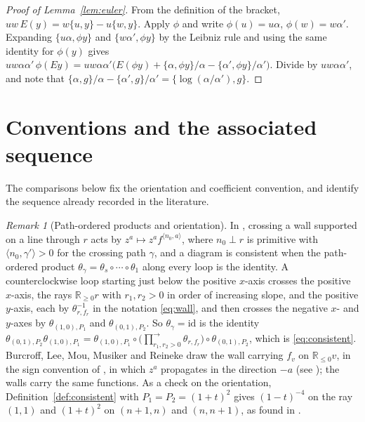 \documentclass[11pt]{article}
\theoremstyle{definition}
\theoremstyle{remark}
\newtheorem{remark}[theorem]{Remark}
\numberwithin{equation}{section}
\newcommand{\asc}{\textstyle\prod^{\rightarrow}}
\begin{document}
\begin{appendices}
\begin{proof}[Proof of Lemma~\ref{lem:euler}]
From the definition of the bracket, $uw\,E(y)=w\{u,y\}-u\{w,y\}$. Apply
$\phi$ and write $\phi(u)=u\alpha$, $\phi(w)=w\alpha'$. Expanding
$\{u\alpha,\phi y\}$ and $\{w\alpha',\phi y\}$ by the Leibniz rule and
using the same identity for $\phi(y)$ gives
$uw\alpha\alpha'\,\phi(E y)=uw\alpha\alpha'\big(E(\phi y)+\{\alpha,\phi y\}/\alpha-\{\alpha',\phi y\}/\alpha'\big)$.
Divide by $uw\alpha\alpha'$, and note that
$\{\alpha,g\}/\alpha-\{\alpha',g\}/\alpha'=\{\log(\alpha/\alpha'),g\}$.
\end{proof}





\section{Conventions and the associated sequence}\label{sec:conventions}
The comparisons below fix the orientation and coefficient convention,
and identify the sequence already recorded in the literature.

\begin{remark}[Path-ordered products and orientation]\label{rem:GPS}
In \cite[\S1.3]{GPS}, crossing a wall supported on a line through $r$
acts by $z^a\mapsto z^a f^{\langle n_0,a\rangle}$, where $n_0\perp r$ is
primitive with $\langle n_0,\gamma'\rangle>0$ for the crossing path
$\gamma$, and a diagram is consistent when the path-ordered product
$\theta_{\gamma}=\theta_s\circ\cdots\circ\theta_1$ along every loop is the
identity. A counterclockwise loop starting just below the positive
$x$-axis crosses the positive $x$-axis, the rays $\mathbb{R}_{\geq0}r$ with
$r_1,r_2>0$ in order of increasing slope, and the positive $y$-axis, each
by $\theta_{r,f_r}^{-1}$ in the notation \eqref{eq:wall}, and then crosses
the negative $x$- and $y$-axes by $\theta_{(1,0),P_1}$ and
$\theta_{(0,1),P_2}$. So $\theta_\gamma=\mathrm{id}$ is the identity
$\theta_{(0,1),P_2}\theta_{(1,0),P_1}=\theta_{(1,0),P_1}\circ\big(\asc_{r_1,r_2>0}\theta_{r,f_r}\big)\circ\theta_{(0,1),P_2}$,
which is \eqref{eq:consistent}. Burcroff, Lee, Mou, Musiker and Reineke
draw the wall carrying $f_v$ on $\mathbb{R}_{\leq0}v$, in the sign
convention of \cite{GS11}, in which $z^a$ propagates in the direction
$-a$ (see \cite[\S1.2]{GPS}); the walls carry the same functions. As a
check on the orientation, Definition~\ref{def:consistent} with
$P_1=P_2=(1+t)^2$ gives $(1-t)^{-4}$ on the ray $(1,1)$ and $(1+t)^2$ on
$(n+1,n)$ and $(n,n+1)$, as found in \cite[\S1.3]{GPS}.
\end{remark}


\end{appendices}
\end{document}
